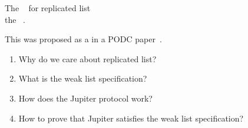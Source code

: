 
\begin{frame}{}
  \begin{center}
    \begin{mdframed}[frametitle = {\large \red{The Main Contribution}}, frametitlerule = true, frametitlebackgroundcolor = brown!20,
      frametitleaboveskip = 8pt, frametitlebelowskip = 8pt, innertopmargin = 10pt]
      {\Large The ~ for replicated list \\
       the ~.} \\[15pt]
    \end{mdframed}

    \pause
    \vspace{0.20cm}
    {\large This was proposed as a  in a PODC paper~.}
  \end{center}
\end{frame}

\begin{frame}{}

  \begin{enumerate}[<+->]
    \setlength{\itemsep}{12pt}
    \item Why do we care about replicated list? 
    \item What is the weak list specification?
    \item How does the Jupiter protocol work?
    \item How to prove that Jupiter satisfies the weak list specification?
  \end{enumerate}
\end{frame}
